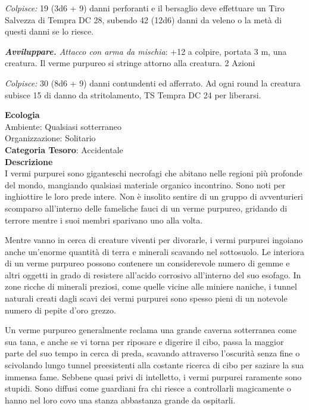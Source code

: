 \begin{multicols}{2}
{\emph{Colpisce:} 19 (3d6 + 9) danni perforanti e il bersaglio deve effettuare un Tiro Salvezza di Tempra DC 28, subendo 42 (12d6) danni da veleno o la metà di questi danni se lo riesce.

\emph{\textbf{Avviluppare.} Attacco con arma da mischia}: +12 a colpire, portata 3 m, una creatura. Il verme purpureo si stringe attorno alla creatura. 2 Azioni

\emph{Colpisce:} 30 (8d6 + 9) danni contundenti ed afferrato. Ad ogni round la creatura subisce 15 di danno da stritolamento, TS Tempra DC 24 per liberarsi.

\textbf{Ecologia}\\
Ambiente: Qualsiasi sotterraneo\\
Organizzazione: Solitario\\
\textbf{Categoria Tesoro}: Accidentale\\
\textbf{Descrizione}\\
I vermi purpurei sono giganteschi necrofagi che abitano nelle regioni più profonde del mondo, mangiando qualsiasi materiale organico incontrino. Sono noti per inghiottire le loro prede intere. Non è insolito sentire di un gruppo di avventurieri scomparso all'interno delle fameliche fauci di un verme purpureo, gridando di terrore mentre i suoi membri sparivano uno alla volta.

Mentre vanno in cerca di creature viventi per divorarle, i vermi purpurei ingoiano anche un'enorme quantità di terra e minerali scavando nel sottosuolo. Le interiora di un verme purpureo possono contenere un considerevole numero di gemme e altri oggetti in grado di resistere all'acido corrosivo all'interno del suo esofago. In zone ricche di minerali preziosi, come quelle vicine alle miniere naniche, i tunnel naturali creati dagli scavi dei vermi purpurei sono spesso pieni di un notevole numero di pepite d'oro grezzo.

Un verme purpureo generalmente reclama una grande caverna sotterranea come sua tana, e anche se vi torna per riposare e digerire il cibo, passa la maggior parte del suo tempo in cerca di preda, scavando attraverso l'oscurità senza fine o scivolando lungo tunnel preesistenti alla costante ricerca di cibo per saziare la sua immensa fame. Sebbene quasi privi di intelletto, i vermi purpurei raramente sono stupidi. Sono diffusi come guardiani fra chi riesce a controllarli magicamente o hanno nel loro covo una stanza abbastanza grande da ospitarli.

}
\end{multicols}
